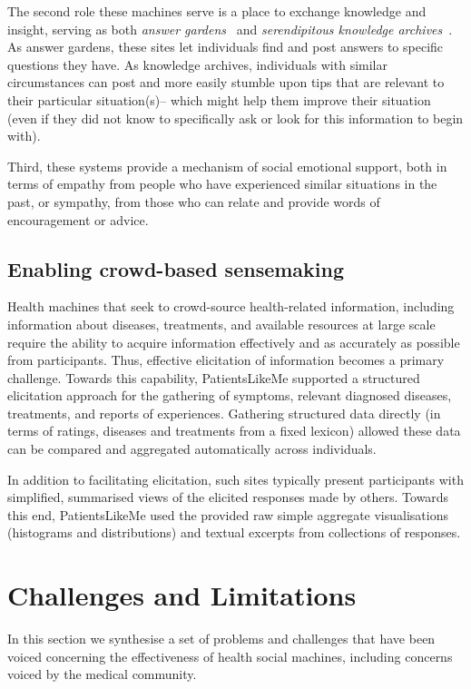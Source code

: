 \documentclass{www13-companion-accepted}
\begin{document}
The second role these machines serve is a place to exchange knowledge
and insight, serving as both \emph{answer gardens}~\cite{answergarden}
and \emph{serendipitous knowledge archives}~\cite{knowledgearchive}.
As answer gardens, these sites let individuals find and post answers
to specific questions they have.  As knowledge archives, individuals
with similar circumstances can post and more easily stumble upon tips
that are relevant to their particular situation(s)-- which might help
them improve their situation (even if they did not know to
specifically ask or look for this information to begin with).

Third, these systems provide a mechanism of social emotional support,
both in terms of empathy from people who have experienced similar
situations in the past, or sympathy, from those who can relate and
provide words of encouragement or advice.

\subsection{Enabling crowd-based sensemaking}

Health machines that seek to crowd-source health-related information,
including information about diseases, treatments, and available
resources at large scale require the ability to acquire information
effectively and as accurately as possible from participants.  Thus,
effective elicitation of information becomes a primary challenge.
Towards this capability, PatientsLikeMe supported a structured
elicitation approach for the gathering of symptoms, relevant diagnosed
diseases, treatments, and reports of experiences.  Gathering
structured data directly (in terms of ratings, diseases and treatments
from a fixed lexicon) allowed these data can be compared and
aggregated automatically across individuals.

In addition to facilitating elicitation, such sites typically present
participants with simplified, summarised views of the elicited
responses made by others.  Towards this end, PatientsLikeMe used the
provided raw simple aggregate visualisations (histograms and
distributions) and textual excerpts from collections of responses.

\section{Challenges and Limitations}
\label{sec:limitations}

In this section we synthesise a set of problems and challenges that
have been voiced concerning the effectiveness of health social
machines, including concerns voiced by the medical community. 
\end{document}
